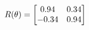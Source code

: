 \documentclass[preview]{standalone}
\begin{document}
\begin{align*}
\special{dvisvgm:raw <g id='unique000'>}R(\theta) = \begin{bmatrix}0.94 & 0.34\\-0.34 & 0.94\end{bmatrix}\special{dvisvgm:raw </g>}
\end{align*}
\end{document}
